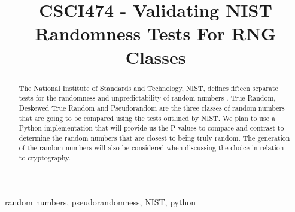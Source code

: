 \documentclass[11pt,letterpaper,conference]{IEEEtran}
\begin{document}
\title{CSCI474 - Validating NIST Randomness Tests For RNG Classes}

\author{
\and
{}
\and
{}
\and
{}
\and
{}
\and
{}
}

\maketitle

\begin{abstract}
The National Institute of Standards and Technology, NIST, defines fifteen separate tests
for the randomness and unpredictability of random numbers \cite{nistbook}. True Random, Deskewed True
Random and Pseudorandom are the three classes of random numbers that are going to be
compared using the tests outlined by NIST. We plan to use a Python implementation that will
provide us the P-values to compare and contrast to determine the random numbers that are
closest to being truly random. The generation of the random numbers will also be considered
when discussing the choice in relation to cryptography.
\end{abstract}

\begin{IEEEkeywords}
random numbers, pseudorandomness, NIST, python
\end{IEEEkeywords}
\end{document}

